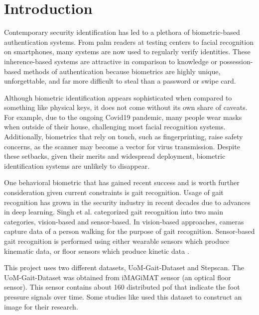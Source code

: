\section{Introduction}

Contemporary security identification has led to a plethora of biometric-based authentication systems. From palm readers at testing centers to facial recognition on smartphones, many systems are now used to regularly verify identities. These inherence-based systems are attractive in comparison to knowledge or possession-based methods of authentication because biometrics are highly unique, unforgettable, and far more difficult to steal than a password or swipe card.

Although biometric identification appears sophisticated when compared to something like physical keys, it does not come without its own share of caveats. For example, due to the ongoing Covid19 pandemic, many people wear masks when outside of their house, challenging most facial recognition systems. Additionally, biometrics that rely on touch, such as fingerprinting, raise safety concerns, as the scanner may become a vector for virus transmission. Despite these setbacks, given their merits and widespread deployment, biometric identification systems are unlikely to disappear.

One behavioral biometric that has gained recent success and is worth further consideration given current constraints is gait recognition. Usage of gait recognition has grown in the security industry in recent decades due to advances in deep learning. Singh et al. \cite{Singh2019APerspectives} categorized gait recognition into two main categories, vision-based and sensor-based. In vision-based approaches, cameras capture data of a person walking for the purpose of gait recognition. Sensor-based gait recognition is performed using either wearable sensors which produce kinematic data, or floor sensors which produce kinetic data \cite{Connor2018BiometricFeatures}.


This project uses two different datasets, UoM-Gait-Dataset and Stepscan. The UoM-Gait-Dataset was obtained from iMAGiMAT sensor \cite{Cantoral-Ceballos2015IntelligentEnvironments} (an optical floor sensor). This sensor contains about 160 distributed \gls{pof} that indicate the foot pressure signals over time. Some studies like \cite{Costilla-Reyes2020DeepHealthcare} used this dataset to construct an image for their research.

